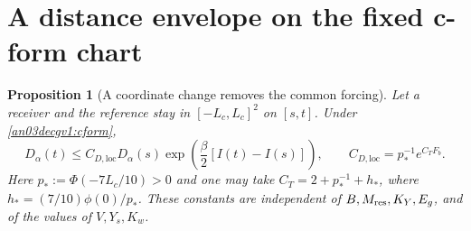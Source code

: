 \documentclass[11pt]{article}
\newtheorem{proposition}{Proposition}[section]
\theoremstyle{remark}\newtheorem{remark}[proposition]{Remark}
\begin{document}
\section{A distance envelope on the fixed c-form chart}
\begin{proposition}[A coordinate change removes the common forcing]
\label{an03decgv1:local}
Let a receiver and the reference stay in $[-L_c,L_c]^2$
on $[s,t]$. Under \eqref{an03decgv1:cform},
\begin{equation}
 D_\alpha(t)\le C_{D,\mathrm{loc}}D_\alpha(s)
        \exp\!\left(\frac\beta2[I(t)-I(s)]\right),\qquad
 C_{D,\mathrm{loc}}=p_*^{-1}e^{C_TF_b}.
 \label{an03decgv1:localdistance}
\end{equation}
Here $p_*:=\Phi(-7L_c/10)>0$ and one may take
$C_T=2+p_*^{-1}+h_*$, where
$h_*=(7/10)\phi(0)/p_*$.
These constants are independent of $B,M_{\rm res},K_Y,E_g$,
and of the values of $V,Y_s,K_w$.
\end{proposition}
\end{document}
